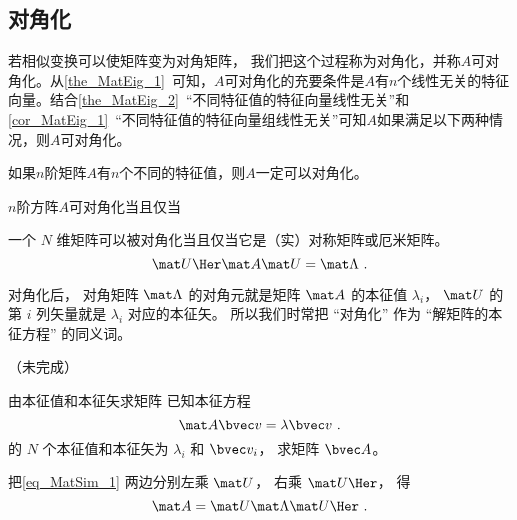 \subsection{对角化}

若相似变换可以使矩阵变为对角矩阵， 我们把这个过程称为对角化，并称$A$可对角化。从\autoref{the_MatEig_1}~可知，$A$可对角化的充要条件是$A$有$n$个线性无关的特征向量。结合\autoref{the_MatEig_2}~“不同特征值的特征向量线性无关”和\autoref{cor_MatEig_1}~“不同特征值的特征向量组线性无关”可知$A$如果满足以下两种情况，则$A$可对角化。
\begin{corollary}{}
如果$n$阶矩阵$A$有$n$个不同的特征值，则$A$一定可以对角化。
\end{corollary}
\begin{corollary}{2}
$n$阶方阵$A$可对角化当且仅当
\end{corollary}

一个 $N$ 维矩阵可以被对角化当且仅当它是（实）对称矩阵或厄米矩阵。
\begin{equation}\label{eq_MatSim_1}
\mat U\Her \mat A \mat U = \mat \Lambda~.
\end{equation}

对角化后， 对角矩阵 $\mat \Lambda$ 的对角元就是矩阵 $\mat A$ 的本征值 $\lambda_i$， $\mat U$ 的第 $i$ 列矢量就是 $\lambda_i$ 对应的本征矢。 所以我们时常把 “对角化” 作为 “解矩阵的本征方程” 的同义词。

（未完成）

\begin{example}{由本征值和本征矢求矩阵}
已知本征方程
\begin{equation}
\mat A \bvec v = \lambda \bvec v~.
\end{equation}
的 $N$ 个本征值和本征矢为 $\lambda_i$ 和 $\bvec v_i$， 求矩阵 $\bvec A$。

把\autoref{eq_MatSim_1} 两边分别左乘 $\mat U$， 右乘 $\mat U\Her$， 得
\begin{equation}
\mat A = \mat U \mat \Lambda \mat U\Her~.
\end{equation}
\end{example}
